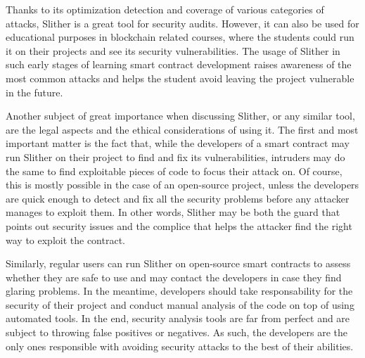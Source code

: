 Thanks to its optimization detection and coverage of various categories of attacks, Slither is a great tool for security audits. However, it can also be used for educational purposes in blockchain related courses, where the students could run it on their projects and see its security vulnerabilities. The usage of Slither in such early stages of learning smart contract development raises awareness of the most common attacks and helps the student avoid leaving the project vulnerable in the future.

Another subject of great importance when discussing Slither, or any similar tool, are the legal aspects and the ethical considerations of using it. The first and most important matter is the fact that, while the developers of a smart contract may run Slither on their project to find and fix its vulnerabilities, intruders may do the same to find exploitable pieces of code to focus their attack on. Of course, this is mostly possible in the case of an open-source project, unless the developers are quick enough to detect and fix all the security problems before any attacker manages to exploit them. In other words, Slither may be both the guard that points out security issues and the complice that helps the attacker find the right way to exploit the contract.

Similarly, regular users can run Slither on open-source smart contracts to assess whether they are safe to use and may contact the developers in case they find glaring problems. In the meantime, developers should take responsability for the security of their project and conduct manual analysis of the code on top of using automated tools. In the end, security analysis tools are far from perfect and are subject to throwing false positives or negatives. As such, the developers are the only ones responsible with avoiding security attacks to the best of their abilities.